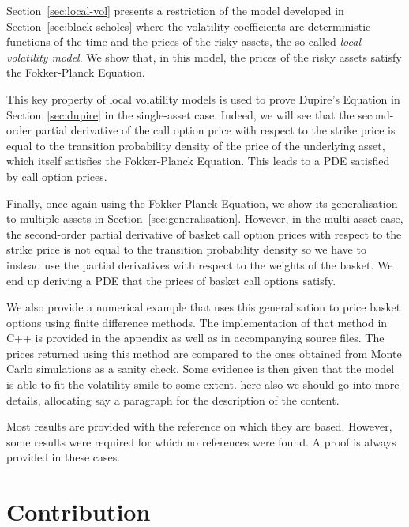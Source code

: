 \documentclass[english]{article}
\newcommand{\comment}[1]{\color{blue}#1\color{black}}
\numberwithin{equation}{section}
\numberwithin{figure}{section}
\theoremstyle{bolddescit}
\theoremstyle{definition}
\theoremstyle{definition}
\theoremstyle{plain}
\theoremstyle{plain}
\theoremstyle{bolddesc}
\theoremstyle{plain}
\theoremstyle{remark}
\begin{document}
Section~\ref{sec:local-vol} presents a restriction of the model developed in Section~\ref{sec:black-scholes} where the volatility coefficients are deterministic functions of the time and the prices of the risky assets, the so-called \textit{local volatility model}. We show that, in this model, the prices of the risky assets satisfy the Fokker-Planck Equation.

This key property of local volatility models is used to prove Dupire's Equation in Section~\ref{sec:dupire} in the single-asset case. Indeed, we will see that the second-order partial derivative of the call option price with respect to the strike price is equal to the transition probability density of the price of the underlying asset, which itself satisfies the Fokker-Planck Equation. This leads to a PDE satisfied by call option prices.

Finally, once again using the Fokker-Planck Equation, we show its generalisation to multiple assets in Section~\ref{sec:generalisation}. However, in the multi-asset case, the second-order partial derivative of basket call option prices with respect to the strike price is not equal to the transition probability density so we have to instead use the partial derivatives with respect to the weights of the basket. We end up deriving a PDE that the prices of basket call options satisfy.

We also provide a numerical example that uses this generalisation to price basket options using finite difference methods.  The implementation of that method in C++ is provided in the appendix as well as in accompanying source files. The prices returned using this method are compared to the ones obtained from Monte Carlo simulations as a sanity check. Some evidence is then given that the model is able to fit the volatility smile to some extent.
\comment{here also we should go into more details, allocating say a paragraph for the description of the content.}

Most results are provided with the reference on which they are based. However, some results were required for which no references were found. A proof is always provided in these cases.

\section{Contribution}
\end{document}
